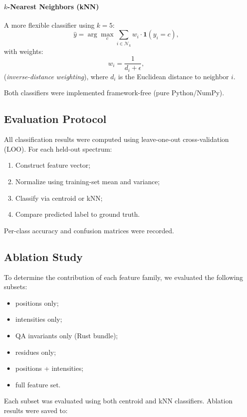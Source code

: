 \documentclass[12pt]{article}
\begin{document}
\paragraph{$k$-Nearest Neighbors (kNN)}
A more flexible classifier using $k=5$:
\[
\hat{y} = \arg\max_{c} \sum_{i \in \mathcal{N}_k} w_i \cdot \mathbf{1}(y_i=c),
\]
with weights:
\[
w_i = \frac{1}{d_i + \epsilon},
\]
(\textit{inverse-distance weighting}), where $d_i$ is the Euclidean distance to neighbor $i$.

Both classifiers were implemented framework-free (pure Python/NumPy).

\subsection{Evaluation Protocol}

All classification results were computed using leave-one-out cross-validation (LOO). For each held-out
spectrum:

\begin{enumerate}
    \item Construct feature vector;
    \item Normalize using training-set mean and variance;
    \item Classify via centroid or kNN;
    \item Compare predicted label to ground truth.
\end{enumerate}

Per-class accuracy and confusion matrices were recorded.

\subsection{Ablation Study}

To determine the contribution of each feature family, we evaluated the following subsets:

\begin{itemize}
    \item positions only;
    \item intensities only;
    \item QA invariants only (Rust bundle);
    \item residues only;
    \item positions + intensities;
    \item full feature set.
\end{itemize}

Each subset was evaluated using both centroid and kNN classifiers.  
Ablation results were saved to:
\end{document}
